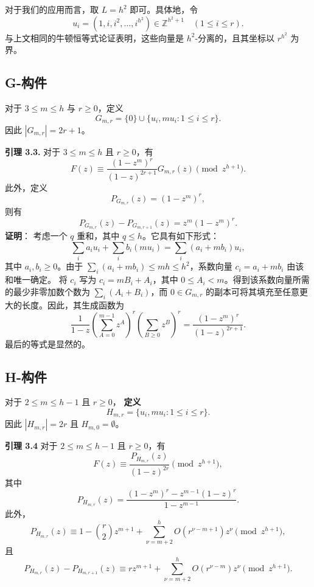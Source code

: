 \documentclass[11pt]{article}
\theoremstyle{break}
\begin{document}
对于我们的应用而言，取 $L = h^2$ 即可。具体地，令
\[ u_i = (1, i, i^2, \dots, i^{h^2}) \in \mathbb{Z}^{h^2+1} \quad (1 \le i \le r). \]
与上文相同的牛顿恒等式论证表明，这些向量是 $h^2$-分离的，且其坐标以 $r^{h^2}$ 为界。
\subsection{G-构件}
对于 $3 \le m \le h$ 与 $r \ge 0$，定义
\[
G_{m,r} = \{0\} \cup \{u_i, m u_i : 1 \le i \le r\}.
\]
因此 $|G_{m,r}| = 2r+1$。

\textbf{引理 3.3.} 对于 $3 \le m \le h$ 且 $r \ge 0$，有
\[ F(z) \equiv \frac{(1-z^m)^r}{(1-z)^{2r+1}} G_{m,r}(z) \pmod{z^{h+1}}. \]
此外，定义
\[ P_{G_{m,r}}(z) = (1-z^m)^r, \]
则有
\[ P_{G_{m,r}}(z) - P_{G_{m,r+1}}(z) = z^m(1-z^m)^r. \]
\textbf{证明}：
考虑一个 $q$ 重和，其中 $q \le h$。它具有如下形式：
\[ \sum_i a_i u_i + \sum_i b_i (m u_i) = \sum_i (a_i + m b_i) u_i, \]
其中 $a_i, b_i \ge 0$。由于 $\sum_i (a_i + m b_i) \le mh \le h^2$，系数向量 $c_i = a_i + m b_i$ 由该和唯一确定。
将 $c_i$ 写为 $c_i = m B_i + A_i$，其中 $0 \le A_i < m$。得到该系数向量所需的最少非零加数个数为 $\sum_i (A_i + B_i)$，而 $0 \in G_{m,r}$ 的副本可将其填充至任意更大的长度。因此，其生成函数为
\[ \frac{1}{1-z} \left( \sum_{A=0}^{m-1} z^A \right)^r \left( \sum_{B \ge 0} z^B \right)^r = \frac{(1-z^m)^r}{(1-z)^{2r+1}}. \]
最后的等式是显然的。
\subsection{H-构件}
对于 $2 \le m \le h-1$ 且 $r \ge 0$，
\textbf{定义}
\[ H_{m,r} = \{u_i, mu_i : 1 \le i \le r\}. \]
因此 $|H_{m,r}| = 2r$ 且 $H_{m,0} = \emptyset$。

\textbf{引理 3.4}
对于 $2 \le m \le h-1$ 且 $r \ge 0$，有
\[ F(z) \equiv \frac{P_{H_{m,r}}(z)}{(1-z)^{2r}} \pmod{z^{h+1}}, \]
其中
\[ P_{H_{m,r}}(z) = \frac{(1-z^m)^r - z^{m-1}(1-z)^r}{1-z^{m-1}}. \]
此外，
\[ P_{H_{m,r}}(z) \equiv 1 - \binom{r}{2} z^{m+1} + \sum_{\nu=m+2}^h O(r^{\nu-m+1}) z^\nu \pmod{z^{h+1}}, \]
且
\[ P_{H_{m,r}}(z) - P_{H_{m,r+1}}(z) \equiv r z^{m+1} + \sum_{\nu=m+2}^h O(r^{\nu-m}) z^\nu \pmod{z^{h+1}}. \]
\end{document}
